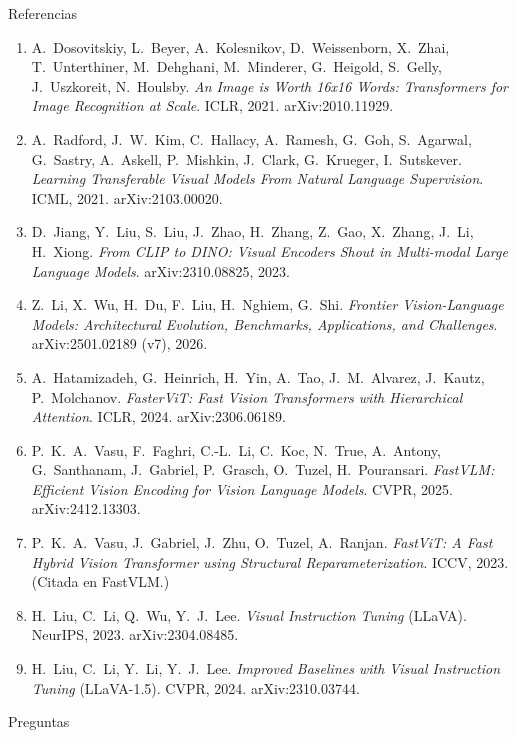 \documentclass[aspectratio=169,10pt]{beamer}
\begin{document}
\begin{frame}{Referencias}
  \scriptsize
  \begin{enumerate}\setlength{\itemsep}{1.5pt}
    \item A.~Dosovitskiy, L.~Beyer, A.~Kolesnikov, D.~Weissenborn, X.~Zhai, T.~Unterthiner, M.~Dehghani, M.~Minderer, G.~Heigold, S.~Gelly, J.~Uszkoreit, N.~Houlsby. \emph{An Image is Worth 16x16 Words: Transformers for Image Recognition at Scale}. ICLR, 2021. arXiv:2010.11929.
    \item A.~Radford, J.~W.~Kim, C.~Hallacy, A.~Ramesh, G.~Goh, S.~Agarwal, G.~Sastry, A.~Askell, P.~Mishkin, J.~Clark, G.~Krueger, I.~Sutskever. \emph{Learning Transferable Visual Models From Natural Language Supervision}. ICML, 2021. arXiv:2103.00020.
    \item D.~Jiang, Y.~Liu, S.~Liu, J.~Zhao, H.~Zhang, Z.~Gao, X.~Zhang, J.~Li, H.~Xiong. \emph{From CLIP to DINO: Visual Encoders Shout in Multi-modal Large Language Models}. arXiv:2310.08825, 2023.
    \item Z.~Li, X.~Wu, H.~Du, F.~Liu, H.~Nghiem, G.~Shi. \emph{Frontier Vision-Language Models: Architectural Evolution, Benchmarks, Applications, and Challenges}. arXiv:2501.02189 (v7), 2026.
    \item A.~Hatamizadeh, G.~Heinrich, H.~Yin, A.~Tao, J.~M.~Alvarez, J.~Kautz, P.~Molchanov. \emph{FasterViT: Fast Vision Transformers with Hierarchical Attention}. ICLR, 2024. arXiv:2306.06189.
    \item P.~K.~A.~Vasu, F.~Faghri, C.-L.~Li, C.~Koc, N.~True, A.~Antony, G.~Santhanam, J.~Gabriel, P.~Grasch, O.~Tuzel, H.~Pouransari. \emph{FastVLM: Efficient Vision Encoding for Vision Language Models}. CVPR, 2025. arXiv:2412.13303.
    \item P.~K.~A.~Vasu, J.~Gabriel, J.~Zhu, O.~Tuzel, A.~Ranjan. \emph{FastViT: A Fast Hybrid Vision Transformer using Structural Reparameterization}. ICCV, 2023. (Citada en FastVLM.)
    \item H.~Liu, C.~Li, Q.~Wu, Y.~J.~Lee. \emph{Visual Instruction Tuning} (LLaVA). NeurIPS, 2023. arXiv:2304.08485.
    \item H.~Liu, C.~Li, Y.~Li, Y.~J.~Lee. \emph{Improved Baselines with Visual Instruction Tuning} (LLaVA-1.5). CVPR, 2024. arXiv:2310.03744.
  \end{enumerate}
\end{frame}

\begin{frame}[standout]
	Preguntas
\end{frame}
\end{document}
